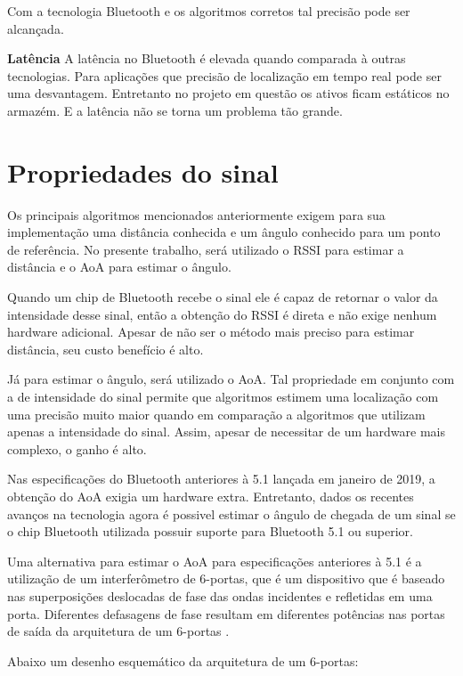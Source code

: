 Com a tecnologia Bluetooth e os algoritmos corretos tal precisão pode ser alcançada.\newline

\textbf{Latência}\newline
A latência no Bluetooth é elevada quando comparada à outras tecnologias. Para aplicações que precisão de localização em tempo real pode ser uma desvantagem. Entretanto no projeto em questão os ativos ficam estáticos no armazém. E a latência não se torna um problema tão grande.\newline

\section{Propriedades do sinal}
Os principais algoritmos mencionados anteriormente exigem para sua implementação uma distância conhecida e um ângulo conhecido para um ponto de referência. No presente trabalho, será utilizado o RSSI para estimar a distância e o AoA para estimar o ângulo.

Quando um chip de Bluetooth recebe o sinal ele é capaz de retornar o valor da intensidade desse sinal, então a obtenção do RSSI é direta e não exige nenhum hardware adicional. Apesar de não ser o método mais preciso para estimar distância, seu custo benefício é alto.

Já para estimar o ângulo, será utilizado o AoA. Tal propriedade em conjunto com a de intensidade do sinal permite que algoritmos estimem uma localização com uma precisão muito maior quando em comparação a algoritmos que utilizam apenas a intensidade do sinal. Assim, apesar de necessitar de um hardware mais complexo, o ganho é alto.

Nas especificações do Bluetooth anteriores à 5.1 lançada em janeiro de 2019, a obtenção do AoA exigia um hardware extra.
Entretanto, dados os recentes avanços na tecnologia agora é possivel estimar o ângulo de chegada de um sinal se o chip Bluetooth utilizada possuir suporte para Bluetooth 5.1 ou superior.

Uma alternativa para estimar o AoA para especificações anteriores à 5.1 é a utilização de um interferômetro de 6-portas, que é um dispositivo que é baseado nas superposições deslocadas de fase das ondas incidentes e refletidas em uma porta. Diferentes defasagens de fase resultam em diferentes potências nas portas de saída da arquitetura de um 6-portas \cite{art14}.

Abaixo um desenho esquemático da arquitetura de um 6-portas: 

